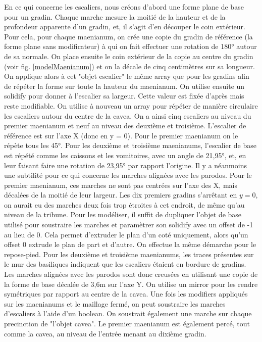 En ce qui concerne les escaliers, nous créons d'abord une forme plane de base pour un gradin. Chaque marche mesure la moitié de la hauteur et de la profondeur apparente d'un gradin, et, il s'agit d'en découper le coin extérieur. Pour cela, pour chaque \gls{maenianum}, on crée une copie du gradin de référence (la forme plane sans modificateur) à qui on fait effectuer une rotation de 180° autour de sa normale. On place ensuite le coin extérieur de la copie au centre du gradin (voir fig. \ref{modelMaenianum}) et on la décale de cinq centimètres sur sa longueur. On applique alors à cet "objet escalier" le même \gls{array} que pour les gradins afin de répéter la forme sur toute la hauteur du  \gls{maenianum}. On utilise ensuite un \gls{solidify} pour donner à l'escalier sa largeur. Cette valeur est fixée d'après \cite[Pl. XIX]{orangePl} mais reste modifiable. On utilise à nouveau un \gls{array} pour répéter de manière circulaire les escaliers autour du centre de la \gls{cavea}. On a ainsi cinq escaliers au niveau du premier \gls{maenianum} et neuf au niveau des deuxième et troisième. L'escalier de référence est sur l'axe X (donc en y = 0). Pour le premier \gls{maenianum} on le répète tous les 45°. Pour les deuxième et troisième \glspl{maenianum}, l'escalier de base est répété comme les caissons et les vomitoires, avec un angle de 21,95°, et, en leur faisant faire une rotation de 23,95° par rapport l'origine. Il y a néanmoins une subtilité pour ce qui concerne les marches alignées avec les \gls{parodos}. Pour le premier \gls{maenianum}, ces marches ne sont pas centrées sur l'axe des X, mais décalées de la moitié de leur largeur. Les dix premiers gradins s'arrêtant en $y = 0$, on aurait eu des marches deux fois trop étroites à cet endroit, de même qu'au niveau de la tribune. Pour les modéliser, il suffit de dupliquer l'objet de base utilisé pour soustraire les marches et paramètrer son \gls{solidify} avec un offset de -1 au lieu de 0. Cela permet d'extruder le plan d'un coté uniquement, alors qu'un offset 0 extrude le plan de part et d'autre. On effectue la même démarche pour le repose-pied. Pour les deuxième et troisième \glspl{maenianum}, les traces présentes sur le mur des basiliques indiquent que les escaliers étaient en bordure de gradins. Les marches alignées avec les \gls{parodos} sont donc creusées en utilisant une copie de la forme de base décalée de 3,6m sur l'axe Y. On utilise un \gls{mirror} pour les rendre symétriques par rapport au centre de la \gls{cavea}.
Une fois les \glspl{modifier} appliqués sur les \glspl{maenianum} et le maillage fermé, on peut soustraire les marches d'escaliers à l'aide d'un \gls{boolean}. On soustrait également une marche sur chaque \gls{precinction} de "l'objet cavea". Le premier \gls{maenianum} est également percé, tout comme la \gls{cavea}, au niveau de l'entrée menant au dixième gradin.

